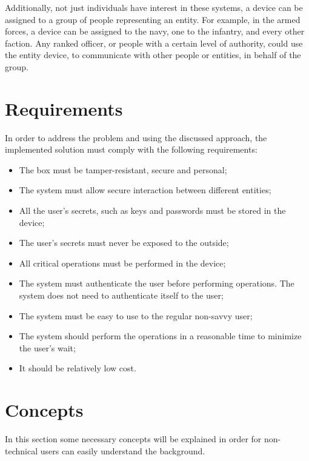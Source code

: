 Additionally, not just individuals have interest in these systems, a device can be assigned to a group of people representing an entity. For example, in the armed forces, a device can be assigned to the navy, one to the infantry, and every other faction. Any ranked officer, or people with a certain level of authority, could use the entity device, to communicate with other people or entities, in behalf of the group.

\section{Requirements} \label{chap:problem:requirements}

In order to address the problem and using the discussed approach, the implemented solution must comply with the following requirements:
\begin{itemize}
	\item The box must be tamper-resistant, secure and personal;
	\item The system must allow secure interaction between different entities;
	\item All the user's secrets, such as keys and passwords must be stored in the device;
	\item The user's secrets must never be exposed to the outside;
	\item All critical operations must be performed in the device;
	\item The system must authenticate the user before performing operations. The system does not need to authenticate itself to the user;
	\item The system must be easy to use to the regular non-savvy user;
	\item The system should perform the operations in a reasonable time to minimize the user's wait;
	\item It should be relatively low cost.
\end{itemize}

\section{Concepts} \label{chap:problem:concepts}

In this section some necessary concepts will be explained in order for non-technical users can easily understand the background.

